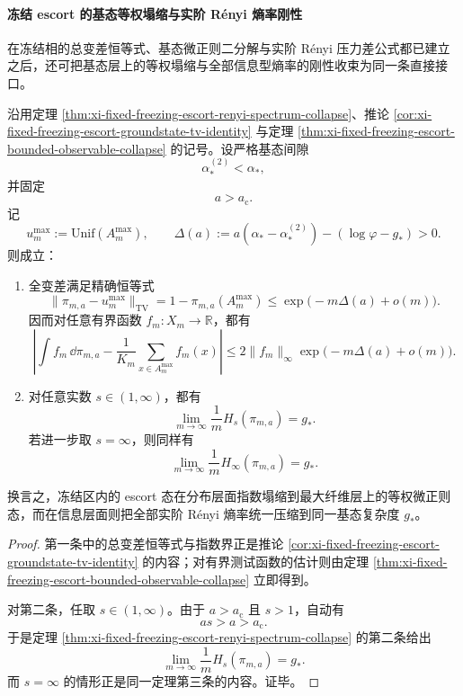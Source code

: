 \paragraph{冻结 escort 的基态等权塌缩与实阶 Rényi 熵率刚性}
在冻结相的总变差恒等式、基态微正则二分解与实阶 Rényi 压力差公式都已建立之后，还可把基态层上的等权塌缩与全部信息型熵率的刚性收束为同一条直接接口。

\begin{corollary}\label{cor:xi-time-part57bb-freezing-groundstate-equidistribution-renyi-rigidity}
沿用定理 \ref{thm:xi-fixed-freezing-escort-renyi-spectrum-collapse}、推论 \ref{cor:xi-fixed-freezing-escort-groundstate-tv-identity} 与定理 \ref{thm:xi-fixed-freezing-escort-bounded-observable-collapse} 的记号。设严格基态间隙
\[
\alpha_*^{(2)}<\alpha_*,
\]
并固定
\[
a>a_{\mathrm c}.
\]
记
\[
u_m^{\max}:=\mathrm{Unif}(A_m^{\max}),
\qquad
\Delta(a):=a(\alpha_*-\alpha_*^{(2)})-(\log\varphi-g_*)>0.
\]
则成立：
\begin{enumerate}
  \item 全变差满足精确恒等式
  \[
  \|\pi_{m,a}-u_m^{\max}\|_{\mathrm{TV}}
  =
  1-\pi_{m,a}(A_m^{\max})
  \le
  \exp\!\bigl(-m\Delta(a)+o(m)\bigr).
  \]
  因而对任意有界函数 \(f_m:X_m\to\mathbb R\)，都有
  \[
  \left|
  \int f_m\,\dd\pi_{m,a}
  -
  \frac1{K_m}\sum_{x\in A_m^{\max}}f_m(x)
  \right|
  \le
  2\|f_m\|_\infty
  \exp\!\bigl(-m\Delta(a)+o(m)\bigr).
  \]
  \item 对任意实数 \(s\in(1,\infty)\)，都有
  \[
  \lim_{m\to\infty}\frac1m H_s(\pi_{m,a})=g_*.
  \]
  若进一步取 \(s=\infty\)，则同样有
  \[
  \lim_{m\to\infty}\frac1m H_\infty(\pi_{m,a})=g_*.
  \]
\end{enumerate}
换言之，冻结区内的 escort 态在分布层面指数塌缩到最大纤维层上的等权微正则态，而在信息层面则把全部实阶 Rényi 熵率统一压缩到同一基态复杂度 \(g_*\)。
\end{corollary}
\begin{proof}
第一条中的总变差恒等式与指数界正是推论 \ref{cor:xi-fixed-freezing-escort-groundstate-tv-identity} 的内容；对有界测试函数的估计则由定理 \ref{thm:xi-fixed-freezing-escort-bounded-observable-collapse} 立即得到。

对第二条，任取 \(s\in(1,\infty)\)。由于 \(a>a_{\mathrm c}\) 且 \(s>1\)，自动有
\[
as>a>a_{\mathrm c}.
\]
于是定理 \ref{thm:xi-fixed-freezing-escort-renyi-spectrum-collapse} 的第二条给出
\[
\lim_{m\to\infty}\frac1m H_s(\pi_{m,a})=g_*.
\]
而 \(s=\infty\) 的情形正是同一定理第三条的内容。证毕。
\end{proof}

